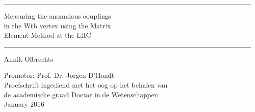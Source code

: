 \vspace{1.5cm}
\begin{minipage}{\textwidth}
  \begin{flushleft}
    \rule{\textwidth}{1mm}
  \end{flushleft}
  \begin{center}
    \begin{bfseries}
      \begin{sffamily}
        \begin{Huge}%
          Measuring the anomalous couplings \\ \vspace{0.2cm}
          in the Wtb vertex using the Matrix \\ \vspace{0.4cm}
          Element Method at the LHC
        \end{Huge}
      \end{sffamily}
    \end{bfseries}
  \end{center}
  \begin{flushright}
    \rule{\textwidth}{1mm}
  \end{flushright}
\end{minipage}

\vspace{1.5cm}
\begin{minipage}{\textwidth}
  \begin{center}
    \begin{bfseries}
      \begin{sffamily}
        \begin{LARGE}
          Annik Olbrechts\\
        \end{LARGE}
      \end{sffamily}
    \end{bfseries}
  \end{center}
\end{minipage}

\vspace{1.5cm}
\begin{minipage}{\textwidth}
  \begin{center}
    \begin{large}
      Promotor:  Prof. Dr. Jorgen D'Hondt\\[5mm]
      Proefschrift ingediend met het oog op het behalen van\\
      de academische graad Doctor in de Wetenschappen\\[10mm]
      January 2016
    \end{large}
  \end{center}
\end{minipage}

